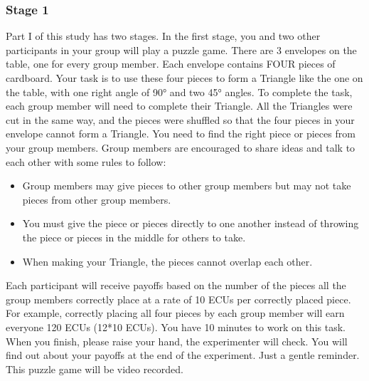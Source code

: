 \subsubsection{\textbf{Stage 1}}
\newline
Part I of this study has two stages. In the first stage, you and two other participants in your group will play a puzzle game. There are 3 envelopes on the table, one for every group member. Each envelope contains FOUR pieces of cardboard. Your task is to use these four pieces to form a Triangle like the one on the table, with one right angle of 90° and two 45° angles. To complete the task, each group member will need to complete their Triangle. 
All the Triangles were cut in the same way, and the pieces were shuffled so that the four pieces in your envelope cannot form a Triangle. You need to find the right piece or pieces from your group members. Group members are encouraged to share ideas and talk to each other with some rules to follow: 
\begin{itemize}
    \item Group members may give pieces to other group members but may not take pieces from other group members. 
    \item You must give the piece or pieces directly to one another instead of throwing the piece or pieces in the middle for others to take. 
    \item When making your Triangle, the pieces cannot overlap each other.
\end{itemize}
Each participant will receive payoffs based on the number of the pieces all the group members correctly place at a rate of 10 ECUs per correctly placed piece. For example, correctly placing all four pieces by each group member will earn everyone 120 ECUs (12*10 ECUs). 
You have 10 minutes to work on this task. When you finish, please raise your hand, the experimenter will check. You will find out about your payoffs at the end of the experiment. Just a gentle reminder. This puzzle game will be video recorded. 

